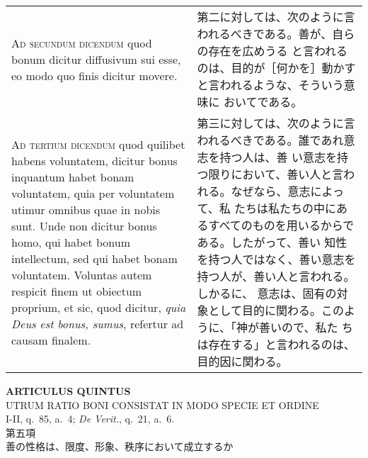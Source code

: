 \documentclass[10pt]{jsarticle}
\begin{document}
\begin{longtable}{p{21em}p{21em}}
\\


{\scshape Ad secundum dicendum} quod bonum dicitur diffusivum sui esse, eo
 modo quo finis dicitur movere.

&


第二に対しては、次のように言われるべきである。善が、自らの存在を広めうる
 と言われるのは、目的が［何かを］動かすと言われるような、そういう意味に
 おいてである。

\\


{\scshape Ad tertium dicendum} quod quilibet habens voluntatem, dicitur
 bonus inquantum habet bonam voluntatem, quia per voluntatem utimur
 omnibus quae in nobis sunt. Unde non dicitur bonus homo, qui habet
 bonum intellectum, sed qui habet bonam voluntatem. Voluntas autem
 respicit finem ut obiectum proprium, et sic, quod dicitur, {\itshape
 quia Deus est bonus, sumus}, refertur ad causam finalem.

&


第三に対しては、次のように言われるべきである。誰であれ意志を持つ人は、善
 い意志を持つ限りにおいて、善い人と言われる。なぜなら、意志によって、私
 たちは私たちの中にあるすべてのものを用いるからである。したがって、善い
 知性を持つ人ではなく、善い意志を持つ人が、善い人と言われる。しかるに、
 意志は、固有の対象として目的に関わる。このように、「神が善いので、私た
 ちは存在する」と言われるのは、目的因に関わる。



\end{longtable}
\newpage
{}
 
\begin{center}
 {\Large {\bf ARTICULUS QUINTUS}}\\
 {\large UTRUM RATIO BONI CONSISTAT IN MODO SPECIE ET ORDINE}\\
 {\footnotesize I-II, q.~85, a.~4; {\itshape De Verit.}, q.~21, a.~6.}\\
 {\Large 第五項\\善の性格は、限度、形象、秩序において成立するか}
\end{center}
\end{document}
